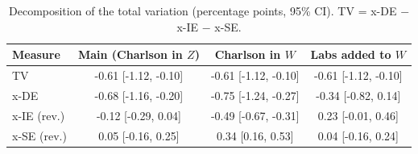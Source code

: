 \begin{table}

\caption{\label{tab:decomposition}Decomposition of the total variation (percentage points, 95\% CI). TV = x-DE $-$ x-IE $-$ x-SE.}
\centering
\begin{tabular}[t]{lccc}
\toprule
Measure & Main (Charlson in $Z$) & Charlson in $W$ & Labs added to $W$\\
\midrule
TV & -0.61 [-1.12, -0.10] & -0.61 [-1.12, -0.10] & -0.61 [-1.12, -0.10]\\
x-DE & -0.68 [-1.16, -0.20] & -0.75 [-1.24, -0.27] & -0.34 [-0.82, 0.14]\\
x-IE (rev.) & -0.12 [-0.29, 0.04] & -0.49 [-0.67, -0.31] & 0.23 [-0.01, 0.46]\\
x-SE (rev.) & 0.05 [-0.16, 0.25] & 0.34 [0.16, 0.53] & 0.04 [-0.16, 0.24]\\
\bottomrule
\end{tabular}
\end{table}
